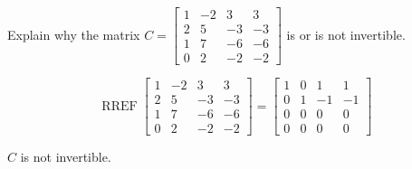 
\begin{exerciseStatement}


Explain why the matrix \(C= \left[\begin{array}{cccc}
1 & -2 & 3 & 3 \\
2 & 5 & -3 & -3 \\
1 & 7 & -6 & -6 \\
0 & 2 & -2 & -2
\end{array}\right] \) is or is not invertible.


\end{exerciseStatement}
    
\begin{exerciseAnswer} 


\[\operatorname{RREF} \left[\begin{array}{cccc}
1 & -2 & 3 & 3 \\
2 & 5 & -3 & -3 \\
1 & 7 & -6 & -6 \\
0 & 2 & -2 & -2
\end{array}\right] = \left[\begin{array}{cccc}
1 & 0 & 1 & 1 \\
0 & 1 & -1 & -1 \\
0 & 0 & 0 & 0 \\
0 & 0 & 0 & 0
\end{array}\right] \]

\(C\) is not invertible.
\end{exerciseAnswer}
    
